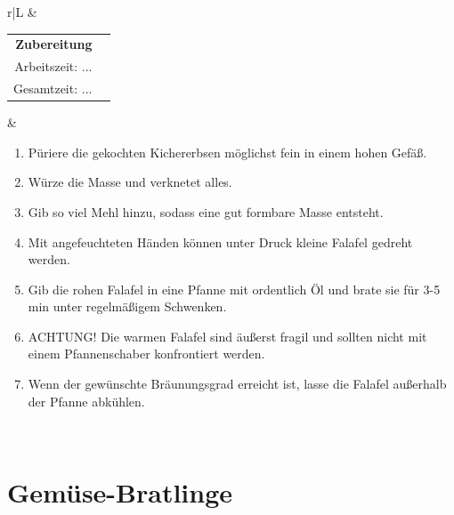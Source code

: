 \documentclass[a4paper, 12pt]{scrbook} 								%
\numberwithin{equation}{section} 									%
\begin{document}
\begin{tabularx}{\textwidth}{r|L}
								&	\\	
		\begin{tabular}[t]{rr}
			\textbf{Zubereitung}	\\
			Arbeitszeit: ...	\\
			Gesamtzeit:	...		\\
		\end{tabular}			&	\begin{enumerate}[]
										\item Püriere die gekochten Kichererbsen möglichst fein in einem hohen Gefäß.
										\item Würze die Masse und verknetet alles.
										\item Gib so viel Mehl hinzu, sodass eine gut formbare Masse entsteht.
										\item Mit angefeuchteten Händen können unter Druck kleine Falafel gedreht werden.
										\item Gib die rohen Falafel in eine Pfanne mit ordentlich Öl und brate sie für 3-5 min unter regelmäßigem Schwenken.
										\item ACHTUNG! Die warmen Falafel sind äußerst fragil und sollten nicht mit einem Pfannenschaber konfrontiert werden.
										\item Wenn der gewünschte Bräunungsgrad erreicht ist, lasse die Falafel außerhalb der Pfanne abkühlen.
									\end{enumerate}	\\
	\end{tabularx}
	\newpage


	\section{Gemüse-Bratlinge}	\label{gemuese_bratlinge}
\end{document}
